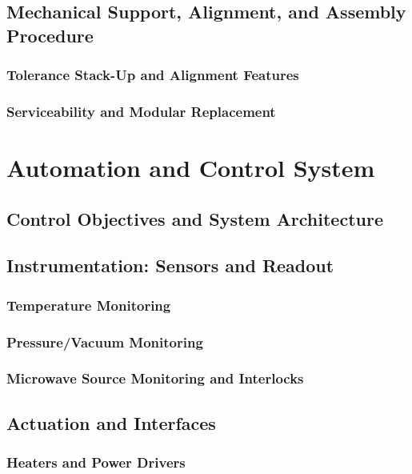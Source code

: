 \documentclass[FM,DP,EN,twoside]{tulthesis}
\begin{document}
\section{Mechanical Support, Alignment, and Assembly Procedure}
\label{sec:mechanical-support-alignment-assembly}
\subsection{Tolerance Stack-Up and Alignment Features}
\label{subsec:tolerance-stack-up-alignment}
\subsection{Serviceability and Modular Replacement}
\label{subsec:serviceability-modular-replacement}

\chapter{Automation and Control System}
\label{sec:automation-and-control-system}
\section{Control Objectives and System Architecture}
\label{sec:control-objectives-architecture}
\section{Instrumentation: Sensors and Readout}
\label{sec:instrumentation-sensors-readout}
\subsection{Temperature Monitoring}
\label{subsec:temperature-monitoring}
\subsection{Pressure/Vacuum Monitoring}
\label{subsec:pressure-vacuum-monitoring}
\subsection{Microwave Source Monitoring and Interlocks}
\label{subsec:mw-monitoring-interlocks}
\section{Actuation and Interfaces}
\label{sec:actuation-interfaces}
\subsection{Heaters and Power Drivers}
\label{subsec:heaters-power-drivers}
\end{document}
